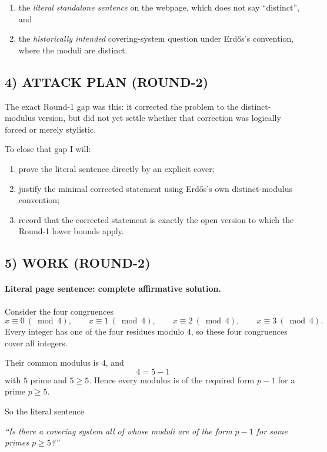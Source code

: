 \begin{enumerate}
\item the \emph{literal standalone sentence} on the webpage, which does not say ``distinct'', and
\item the \emph{historically intended} covering-system question under Erd\H{o}s's convention, where the moduli are distinct.
\end{enumerate}

\subsection*{4) ATTACK PLAN (ROUND-2)}

The exact Round-1 gap was this: it corrected the problem to the distinct-modulus version, but did not yet settle whether that correction was logically forced or merely stylistic.

To close that gap I will:

\begin{enumerate}
\item prove the literal sentence directly by an explicit cover;
\item justify the minimal corrected statement using Erd\H{o}s's own distinct-modulus convention;
\item record that the corrected statement is exactly the open version to which the Round-1 lower bounds apply.
\end{enumerate}

\subsection*{5) WORK (ROUND-2)}

\paragraph{Literal page sentence: complete affirmative solution.}
Consider the four congruences
\[
x\equiv 0 \ (\bmod 4),\qquad
x\equiv 1 \ (\bmod 4),\qquad
x\equiv 2 \ (\bmod 4),\qquad
x\equiv 3 \ (\bmod 4).
\]
Every integer has one of the four residues modulo $4$, so these four congruences cover all integers.

Their common modulus is $4$, and
\[
4=5-1
\]
with $5$ prime and $5\ge 5$.  Hence every modulus is of the required form $p-1$ for a prime $p\ge 5$.

So the literal sentence

\medskip
\centerline{\emph{``Is there a covering system all of whose moduli are of the form $p-1$ for some primes $p\ge 5$?''}}
\medskip

